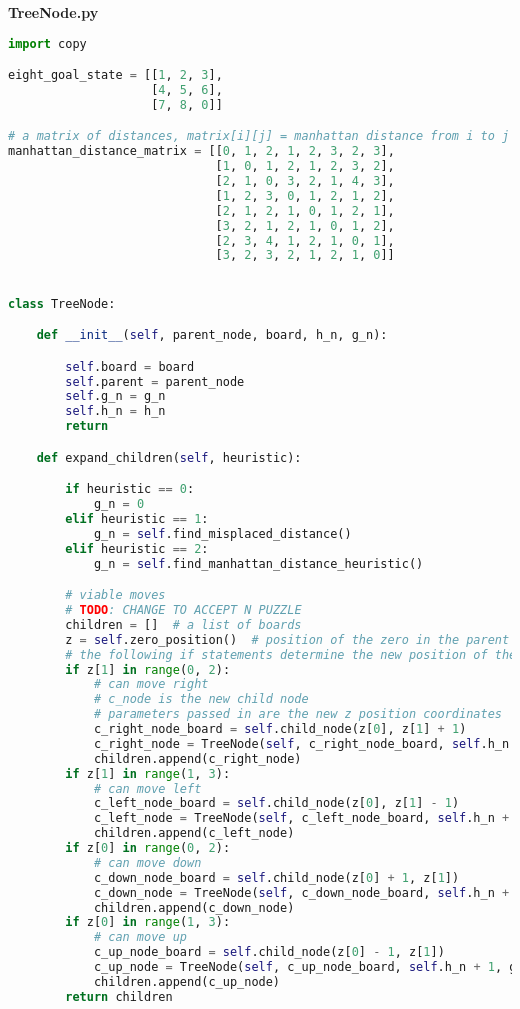 \documentclass{article}
\begin{document}
\textbf{TreeNode.py}
\begin{lstlisting}[language=python]
import copy

eight_goal_state = [[1, 2, 3],
                    [4, 5, 6],
                    [7, 8, 0]]

# a matrix of distances, matrix[i][j] = manhattan distance from i to j
manhattan_distance_matrix = [[0, 1, 2, 1, 2, 3, 2, 3],
                             [1, 0, 1, 2, 1, 2, 3, 2],
                             [2, 1, 0, 3, 2, 1, 4, 3],
                             [1, 2, 3, 0, 1, 2, 1, 2],
                             [2, 1, 2, 1, 0, 1, 2, 1],
                             [3, 2, 1, 2, 1, 0, 1, 2],
                             [2, 3, 4, 1, 2, 1, 0, 1],
                             [3, 2, 3, 2, 1, 2, 1, 0]]


class TreeNode:

    def __init__(self, parent_node, board, h_n, g_n):

        self.board = board
        self.parent = parent_node
        self.g_n = g_n
        self.h_n = h_n
        return

    def expand_children(self, heuristic):

        if heuristic == 0:
            g_n = 0
        elif heuristic == 1:
            g_n = self.find_misplaced_distance()
        elif heuristic == 2:
            g_n = self.find_manhattan_distance_heuristic()

        # viable moves
        # TODO: CHANGE TO ACCEPT N PUZZLE
        children = []  # a list of boards
        z = self.zero_position()  # position of the zero in the parent
        # the following if statements determine the new position of the 0 in the child node
        if z[1] in range(0, 2):
            # can move right
            # c_node is the new child node
            # parameters passed in are the new z position coordinates
            c_right_node_board = self.child_node(z[0], z[1] + 1)
            c_right_node = TreeNode(self, c_right_node_board, self.h_n + 1, g_n)
            children.append(c_right_node)
        if z[1] in range(1, 3):
            # can move left
            c_left_node_board = self.child_node(z[0], z[1] - 1)
            c_left_node = TreeNode(self, c_left_node_board, self.h_n + 1, g_n)
            children.append(c_left_node)
        if z[0] in range(0, 2):
            # can move down
            c_down_node_board = self.child_node(z[0] + 1, z[1])
            c_down_node = TreeNode(self, c_down_node_board, self.h_n + 1, g_n)
            children.append(c_down_node)
        if z[0] in range(1, 3):
            # can move up
            c_up_node_board = self.child_node(z[0] - 1, z[1])
            c_up_node = TreeNode(self, c_up_node_board, self.h_n + 1, g_n)
            children.append(c_up_node)
        return children


\end{lstlisting}
\end{document}

